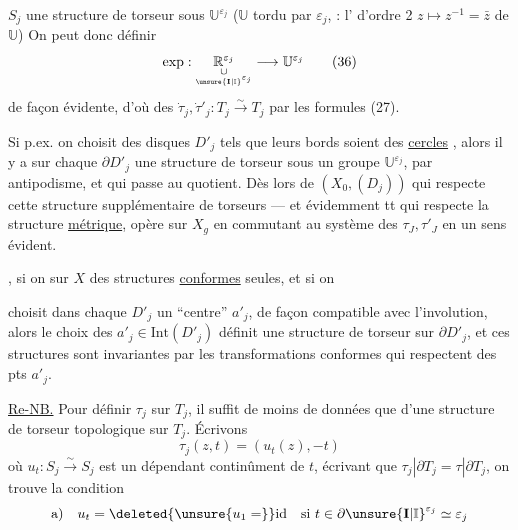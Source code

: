 
$S_j$ une structure de torseur sous $\mathbb U^{\varepsilon_j}$
($\mathbb U$ tordu par $\varepsilon_j$,  : l' d'ordre 2
$z\longmapsto z^{-1}=\bar z$ de $\mathbb U$) On peut donc définir
\[
\exp:\underset{\underset{\unsure{\mathbf I|\mathbb I}^{\varepsilon_j}}{\cup}}{\mathbb R^{\varepsilon_j}}
\longrightarrow\mathbb U^{\varepsilon_j}
\tag{36}
\]
de façon évidente, d'où des 
$\dot\tau_j,\dot\tau'_j:T_j\xrightarrow{\sim}T_j$ par les formules (27).

Si p.ex. on choisit des disques $D'_j$ tels que leurs bords soient des \uline{cercles}
, alors il y a sur chaque  $\partial D'_j$
une structure de torseur sous un groupe $\mathbb U^{\varepsilon_j}$,
 par antipodisme, et qui passe au quotient.
Dès lors   de $(X_0,(D_j))$ qui respecte cette
structure supplémentaire de torseurs --- et évidemment tt  qui respecte
la structure \uline{métrique},  opère sur $X_g$ en commutant
au système des $\tau_J,\tau'_J$ en un sens évident.

, si on   sur $X$
des structures \uline{conformes} seules, et si on


choisit dans chaque $D'_j$ un ``centre'' $a'_j$, de façon compatible avec l'involution,
alors le choix des $a'_j\in\mathrm{Int}(D'_j)$ définit une structure de torseur sur
$\partial D'_j$\unsure{\textsuperscript{*}}, et ces structures sont invariantes par les
transformations conformes qui respectent  des pts $a'_j$.


\uline{Re-NB.} Pour définir $\tau_j$ sur $T_j$, il suffit de 
moins de données que d'une structure de torseur topologique sur $T_j$.
Écrivons 
\[
\tau_j(z,t)=(u_t(z),-t)
\tag{37}
\]
où $u_t:S_j\xrightarrow{\sim}S_j$ est un  dépendant continûment de $t$,
écrivant que $\tau_j|\partial T_j=\tau|\partial T_j$, on trouve la condition
\[
\text{a)}\quad u_t=\deleted{\unsure{u_1=}}\mathrm{id}
\quad\text{si }t\in\partial\unsure{\mathbf I|\mathbb I}^{\varepsilon_j}\simeq\varepsilon_j
\]

